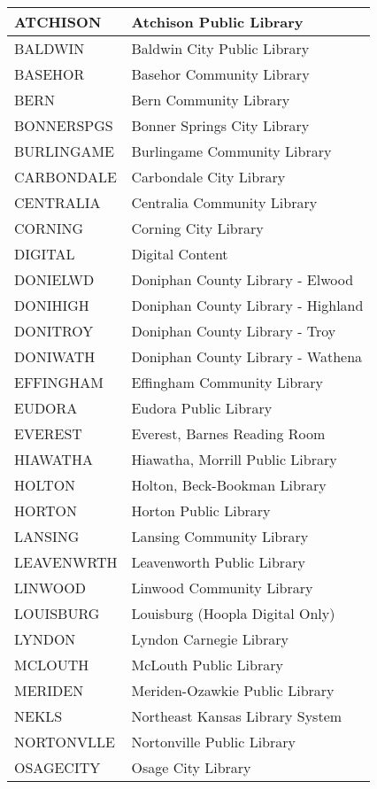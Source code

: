 \documentclass[letterpaper,10pt,english]{sphinxmanual}
\begin{document}
\begin{savenotes}
\begin{longtable}{|l|l|}
ATCHISON
&
Atchison Public Library
\\
\hline
BALDWIN
&
Baldwin City Public Library
\\
\hline
BASEHOR
&
Basehor Community Library
\\
\hline
BERN
&
Bern Community Library
\\
\hline
BONNERSPGS
&
Bonner Springs City Library
\\
\hline
BURLINGAME
&
Burlingame Community Library
\\
\hline
CARBONDALE
&
Carbondale City Library
\\
\hline
CENTRALIA
&
Centralia Community Library
\\
\hline
CORNING
&
Corning City Library
\\
\hline
DIGITAL
&
Digital Content
\\
\hline
DONIELWD
&
Doniphan County Library - Elwood
\\
\hline
DONIHIGH
&
Doniphan County Library - Highland
\\
\hline
DONITROY
&
Doniphan County Library - Troy
\\
\hline
DONIWATH
&
Doniphan County Library - Wathena
\\
\hline
EFFINGHAM
&
Effingham Community Library
\\
\hline
EUDORA
&
Eudora Public Library
\\
\hline
EVEREST
&
Everest, Barnes Reading Room
\\
\hline
HIAWATHA
&
Hiawatha, Morrill Public Library
\\
\hline
HOLTON
&
Holton, Beck-Bookman Library
\\
\hline
HORTON
&
Horton Public Library
\\
\hline
LANSING
&
Lansing Community Library
\\
\hline
LEAVENWRTH
&
Leavenworth Public Library
\\
\hline
LINWOOD
&
Linwood Community Library
\\
\hline
LOUISBURG
&
Louisburg (Hoopla Digital Only)
\\
\hline
LYNDON
&
Lyndon Carnegie Library
\\
\hline
MCLOUTH
&
McLouth Public Library
\\
\hline
MERIDEN
&
Meriden-Ozawkie Public Library
\\
\hline
NEKLS
&
Northeast Kansas Library System
\\
\hline
NORTONVLLE
&
Nortonville Public Library
\\
\hline
OSAGECITY
&
Osage City Library
\\

\end{longtable}
\end{savenotes}
\end{document}

